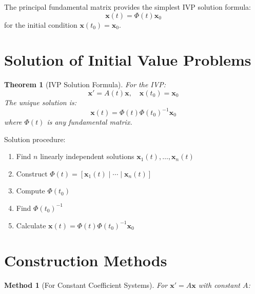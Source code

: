 \documentclass[12pt]{article}
\newtheorem{theorem}{Theorem}
\newtheorem{method}{Method}
\begin{document}
\begin{insight}
The principal fundamental matrix provides the simplest IVP solution formula:
$$\mathbf{x}(t) = \Phi(t)\mathbf{x}_{0}$$
for the initial condition $\mathbf{x}(t_{0}) = \mathbf{x}_{0}$.
\end{insight}

\section{Solution of Initial Value Problems}

\begin{theorem}[IVP Solution Formula]
For the IVP:
$$\mathbf{x}' = A(t)\mathbf{x}, \quad \mathbf{x}(t_{0}) = \mathbf{x}_{0}$$
The unique solution is:
$$\mathbf{x}(t) = \Phi(t)\Phi(t_{0})^{-1}\mathbf{x}_{0}$$
where $\Phi(t)$ is any fundamental matrix.
\end{theorem}

\begin{computation}
Solution procedure:
\begin{enumerate}
\item Find $n$ linearly independent solutions $\mathbf{x}_{1}(t), \ldots, \mathbf{x}_{n}(t)$
\item Construct $\Phi(t) = [\mathbf{x}_{1}(t) \mid \cdots \mid \mathbf{x}_{n}(t)]$
\item Compute $\Phi(t_{0})$
\item Find $\Phi(t_{0})^{-1}$
\item Calculate $\mathbf{x}(t) = \Phi(t)\Phi(t_{0})^{-1}\mathbf{x}_{0}$
\end{enumerate}
\end{computation}

\section{Construction Methods}

\begin{method}[For Constant Coefficient Systems]
For $\mathbf{x}' = A\mathbf{x}$ with constant $A$:
\end{method}
\end{document}
